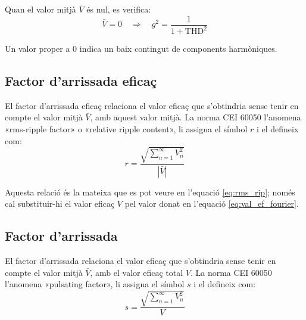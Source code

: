 Quan el valor mitjà $\bar{V}$ és nul, es verifica:
\begin{equation}
   \bar{V}=0 \quad \Rightarrow\quad g^2 = \frac{1}{1+\text{THD}^2}
\end{equation}

Un valor proper a 0 indica un baix contingut de components harmòniques.

\subsection{Factor d'arrissada eficaç}\label{sec:four_fac_arr_ef}

El factor d'arrissada eficaç relaciona el valor eficaç  que
s'obtindria sense tenir en compte el valor mitjà  $\bar{V}$, amb aquest
valor mitjà. La norma CEI 60050 l'anomena «rms-ripple factor» o «relative ripple content», li assigna el símbol $r$ i el defineix com:
\begin{equation}
    r = \frac{\sqrt{\displaystyle\sum_{n=1}^\infty V^2_n}}{|\bar{V}|}
\end{equation}

Aquesta relació és la mateixa que es pot veure en l'equació  \eqref{eq:rms_rip}; només cal substituir-hi el valor eficaç $V$ pel valor donat en l'equació \eqref{eq:val_ef_fourier}.

\subsection{Factor d'arrissada}

El factor d'arrissada relaciona el valor eficaç  que
s'obtindria sense tenir en compte el valor mitjà  $\bar{V}$, amb el
valor eficaç total $V$. La norma CEI 60050 l'anomena «pulsating factor», li assigna el símbol $s$ i el defineix com:
\begin{equation}
    s = \frac{\sqrt{\displaystyle\sum_{n=1}^\infty V^2_n}}{V}
\end{equation}



